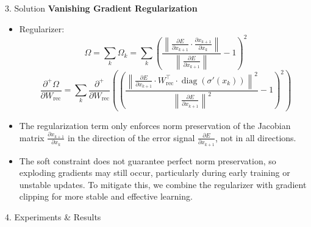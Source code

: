 \begin{frame}[t]
\begin{columns}[t,totalwidth=\textwidth]
\begin{column}{0.3\textwidth}
\begin{block}{3. Solution }
      \textbf{Vanishing Gradient Regularization}
      \begin{itemize}
        \item Regularizer: \[
            \Omega = \sum_k \Omega_k = \sum_k \left(  \frac{ \left\| \frac{\partial E}{\partial x_{k+1}} \cdot \frac{\partial x_{k+1}}{\partial x_k} \right\| }
            { \left\| \frac{\partial E}{\partial x_{k+1}} \right\| } - 1 
            \right)^2
            \]
            \[
            \textstyle
            \frac{\partial^+ \Omega}{\partial W_{\text{rec}}} = \sum_k 
            \frac{\partial^+}{\partial W_{\text{rec}}} \left(
            \left( 
            \frac{ \left\| \frac{\partial E}{\partial x_{k+1}} \cdot W_{\text{rec}}^\top \cdot \operatorname{diag}\left( \sigma'(x_k) \right) \right\|^2 }
            { \left\| \frac{\partial E}{\partial x_{k+1}} \right\|^2 } - 1 
            \right)^2
            \right)
            \]

        \item The regularization term only enforces norm preservation of the Jacobian matrix
                $\frac{\partial x_{k+1}}{\partial x_k}$ in the direction of the error signal 
                $\frac{\partial E}{\partial x_{k+1}}$, not in all directions.
        \item The soft constraint does not guarantee perfect norm preservation, so exploding gradients may still occur, particularly during early training or unstable updates. To mitigate this, we combine the regularizer with gradient clipping for more stable and effective learning.


      \end{itemize}
\end{block}
    \begin{block}{4. Experiments \& Results}


\end{block}
\end{column}
\end{columns}
\end{frame}
